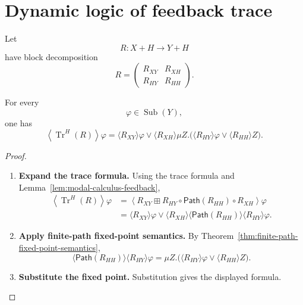 \section{Dynamic logic of feedback trace}
\label{sec:dynamic-logic-categorical-feedback}

Let
\[
  R:X+H\to Y+H
\]
have block decomposition
\[
  R=
  \begin{pmatrix}
    R_{XY} & R_{XH}\\
    R_{HY} & R_{HH}
  \end{pmatrix}.
\]

\begin{theorem}
\label{thm:diamond-law-feedback-trace}
For every
\[
  \varphi\in\operatorname{Sub}(Y),
\]
one has
\[
  \left\langle
    \operatorname{Tr}^{H}(R)
  \right\rangle\varphi
  =
  \langle R_{XY}\rangle\varphi
  \vee
  \langle R_{XH}\rangle
  \mu Z.
  \bigl(
    \langle R_{HY}\rangle\varphi
    \vee
    \langle R_{HH}\rangle Z
  \bigr).
\]
\end{theorem}

\begin{proof}
\begin{enumerate}
  \item \textbf{Expand the trace formula.}
  Using the trace formula and Lemma~\ref{lem:modal-calculus-feedback},
  \[
  \begin{aligned}
    \left\langle
      \operatorname{Tr}^{H}(R)
    \right\rangle\varphi
    &=
    \left\langle
      R_{XY}
      \boxplus
      R_{HY}\circ\mathsf{Path}(R_{HH})\circ R_{XH}
    \right\rangle\varphi
    \\
    &=
    \langle R_{XY}\rangle\varphi
    \vee
    \langle R_{XH}\rangle
    \langle\mathsf{Path}(R_{HH})\rangle
    \langle R_{HY}\rangle\varphi.
  \end{aligned}
  \]

  \item \textbf{Apply finite-path fixed-point semantics.}
  By Theorem~\ref{thm:finite-path-fixed-point-semantics},
  \[
    \langle\mathsf{Path}(R_{HH})\rangle
    \langle R_{HY}\rangle\varphi
    =
    \mu Z.
    \bigl(
      \langle R_{HY}\rangle\varphi
      \vee
      \langle R_{HH}\rangle Z
    \bigr).
  \]

  \item \textbf{Substitute the fixed point.}
  Substitution gives the displayed formula.
\end{enumerate}
\end{proof}

